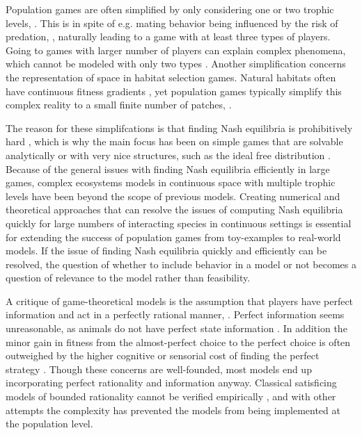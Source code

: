 Population games are often simplified by only considering  one or two trophic levels, \citep{kvrivan2007lotka, sadowski2019predator}. This is in spite of e.g. mating behavior being influenced by the risk of predation, \citep{carranza1999red,lima2009predators}, naturally leading to a game with at least three types of players. Going to games with larger number of players can explain complex phenomena, which cannot be modeled with only two types \citep{pinti2019trophic}. Another simplification concerns the representation of space in habitat selection games.  Natural habitats often have continuous fitness gradients \citep{kawecki2004conceptual}, yet population games typically simplify this complex reality to a small finite number of patches, \cite{valdovinos2010consequences}.

The reason for these simplifcations is that finding Nash equilibria is prohibitively hard \citep{empirical_trait,pinti2019trophic}, which is why the main focus has been on simple games that are solvable analytically \citep{kvrivan2007lotka} or with very nice structures, such as the ideal free distribution \citep{cressman2010ideal}. Because of the general issues with finding Nash equilibria efficiently in large games, complex ecosystems models in continuous space with multiple trophic levels have been beyond the scope of previous models. Creating numerical and theoretical approaches that can resolve the issues of computing Nash equilibria quickly for large numbers of interacting species in continuous settings is essential for extending the success of population games from toy-examples to real-world models. If the issue of finding Nash equilibria quickly and efficiently can be resolved, the question of whether to include behavior in a model or not becomes a question of relevance to the model rather than feasibility.


A critique of game-theoretical models is the assumption that players have perfect information and act in a perfectly rational manner, \citep{jones1999bounded}. Perfect information seems unreasonable, as animals do not have perfect state information \citep{simon1955behavioral}. In addition the minor gain in fitness from the almost-perfect choice to the perfect choice is often outweighed by the higher cognitive or sensorial cost of finding the perfect strategy \citep{simon1956rational, cohen2019bounded}. Though these concerns are well-founded, most models end up incorporating perfect rationality and information anyway. Classical satisficing models of bounded rationality cannot be verified empirically \citep{nonacs1993satisficing}, and with other attempts \citep{bayesianmodel, thuijsman1995automata} the complexity has prevented the models from being implemented at the population level.


